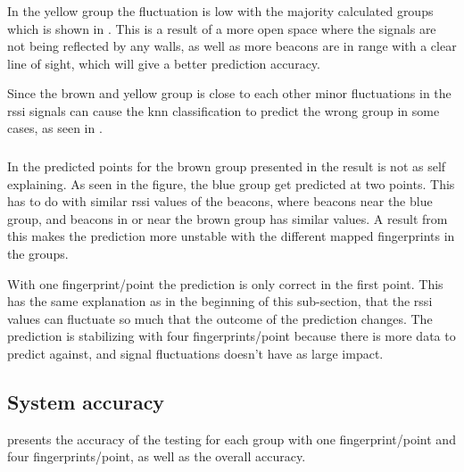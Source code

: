 \subsubsection{}\label{sec:resultsPerPointYellow}
In the yellow group the fluctuation is low with the majority calculated groups which is shown in .
This is a result of a more open space where the signals are not being reflected by any walls, as well as more beacons are in range with a clear line of sight, which will give a better prediction accuracy.


Since the brown and yellow group is close to each other minor fluctuations in the \acrshort{rssi} signals can cause the \acrshort{knn} classification to predict the wrong group in some cases, as seen in .


\subsubsection{}\label{sec:resultsPerPointBrown}
In the predicted points for the brown group presented in  the result is not as self explaining.
As seen in the figure, the blue group get predicted at two points.
This has to do with similar \acrshort{rssi} values of the beacons, where beacons near the blue group, and beacons in or near the brown group has similar values.
A result from this makes the prediction more unstable with the different mapped fingerprints in the groups.


With one fingerprint/point the prediction is only correct in the first point.
This has the same explanation as in the beginning of this sub-section, that the \acrshort{rssi} values can fluctuate so much that the outcome of the prediction changes.
The prediction is stabilizing with four fingerprints/point because there is more data to predict against, and signal fluctuations doesn't have as large impact.


\subsection{System accuracy}\label{sec:resultsSystemAccuracy}
 presents the accuracy of the testing for each group with one fingerprint/point and four fingerprints/point, as well as the overall accuracy.

